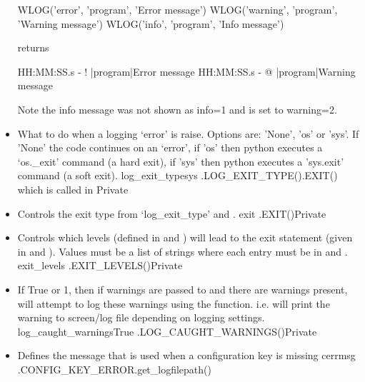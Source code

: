 \begin{itemize}
\begin{minipage}[t]{\textwidth}
\begin{thighlight}
\begin{pythonbox}
WLOG('error', 'program', 'Error message')
WLOG('warning', 'program', 'Warning message')
WLOG('info', 'program', 'Info message')
\end{pythonbox}
returns
\begin{cmdboxprint}
HH:MM:SS.s - ! |program|Error message
HH:MM:SS.s - @ |program|Warning message
\end{cmdboxprint}
\begin{note}
Note the info message was not shown as info=1 and  is set to warning=2.
\end{note}
\end{thighlight}
\end{minipage}
\fi


\ifdevguide
\item {}
{What to do when a logging `error' is raise. Options are: 'None', 'os' or 'sys'. If 'None' the code continues on an `error', if 'os' then python executes a `os.\_exit' command (a hard exit), if 'sys' then python executes a 'sys.exit' command (a soft exit).}
{log\_exit\_type}{sys}
{\AllRecipes}{\spirouCONST.LOG\_EXIT\_TYPE()}{\spirouCONST.EXIT() which is called in \spirouLog}{Private}
\fi

\item {}
{Controls the exit type from `log\_exit\_type' and .}
{exit}
{\AllRecipes}{\spirouCONST.EXIT()}{\spirouLog}{Private}


\item {}
{Controls which levels (defined in  and ) will lead to the exit statement (given in  and ). Values must be a list of strings where each entry must be in  and .}
{exit\_levels}
{\AllRecipes}{\spirouCONST.EXIT\_LEVELS()}{\spirouLog}{Private}


\ifdevguide
\item {}
{If True or 1, then if warnings are passed to  and there are warnings present, will attempt to log these warnings using the  function. i.e. will print the warning to screen/log file depending on logging settings.}
{log\_caught\_warnings}{True}
{\AllRecipes}{\spirouCONST.LOG\_CAUGHT\_WARNINGS()}{\spirouLog}{Private}
\fi

\ifdevguide
\item {}
{Defines the message that is used when a configuration key is missing}
{cerrmsg}
{\AllRecipes}{\spirouCONST.CONFIG\_KEY\_ERROR}{\spirouLog.get\_logfilepath()}
\fi


\end{itemize}



